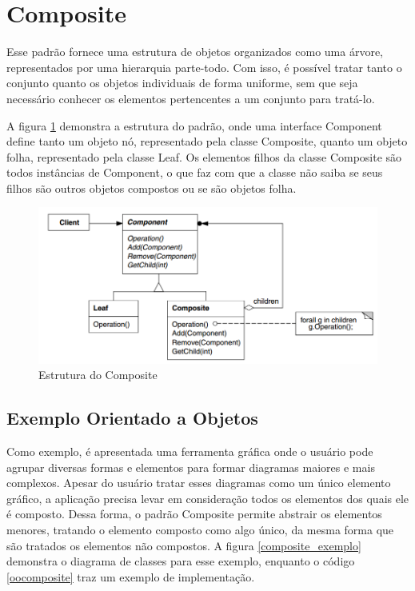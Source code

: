 \section{Composite}

Esse padrão fornece uma estrutura de objetos 
organizados como uma árvore, representados 
por uma hierarquia parte-todo. 
Com isso, é possível tratar tanto o conjunto 
quanto os objetos individuais de forma 
uniforme, sem que seja necessário conhecer 
os elementos pertencentes a um conjunto para 
tratá-lo.

A figura \ref{composite_struct} demonstra a 
estrutura do padrão, onde uma interface Component 
define tanto um objeto nó, representado pela 
classe Composite, quanto um objeto folha, 
representado pela classe Leaf. Os elementos 
filhos da classe Composite são todos instâncias 
de Component, o que faz com que a classe não 
saiba se seus filhos são outros objetos compostos 
ou se são objetos folha.

\begin{figure}[htb]
	\caption{\label{composite_struct}Estrutura do Composite}
	\begin{center}
	    \includegraphics[scale=0.5]{5_padroes-contexto-funcional/5.2_estruturais/5.2.3_composite/diagram.png}
	\end{center}
\end{figure}

\subsection*{Exemplo Orientado a Objetos}

Como exemplo, é apresentada uma ferramenta gráfica 
onde o usuário pode agrupar diversas formas e 
elementos 
para formar diagramas maiores e mais complexos. 
Apesar do usuário tratar esses diagramas como um 
único elemento gráfico, a aplicação precisa levar 
em consideração todos os elementos dos quais ele 
é composto. Dessa forma, o padrão Composite permite 
abstrair os elementos menores, tratando o elemento 
composto como algo único, da mesma forma que 
são tratados os elementos não compostos. A figura 
\ref{composite_exemplo} demonstra o diagrama de 
classes para esse exemplo, enquanto o código 
\ref{oocomposite} traz um exemplo de implementação.

